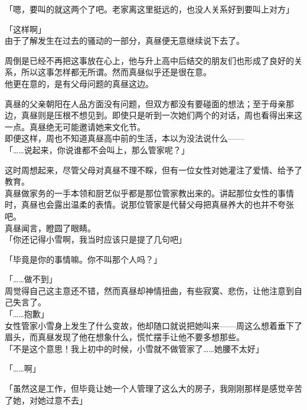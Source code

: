 「嗯，要叫的就这两个了吧。老家离这里挺远的，也没人关系好到要叫上对方」

「这样啊」\\

由于了解发生在过去的骚动的一部分，真昼便无意继续说下去了。

周倒是已经不再把这事放在心上，他与升上高中后结交的朋友们也形成了良好的关系，所以这事怎样都无所谓。然而真昼似乎还是很在意。\\

他更在意的，是有父母问题的真昼这边。

真昼的父亲朝阳在人品方面没有问题，但双方都没有要碰面的想法；至于母亲那边，真昼则是压根不想见到。即使只是听到一次她们两个的对话，周也看得出来这一点。真昼绝无可能邀请她来文化节。\\

即便这样，周也不知道真昼高中前的生活，本以为没法说什么——\\

「……说起来，你说谁都不会叫上，那么管家呢？」

这时周想起来，尽管父母对真昼不理不睬，但有一位女性对她灌注了爱情、给予了教育。\\

真昼做家务的一手本领和厨艺似乎都是那位管家教出来的。讲起那位女性的事情时，真昼也会露出温柔的表情。说那位管家是代替父母把真昼养大的也并不夸张吧。\\

真昼闻言，瞪圆了眼睛。\\

「你还记得小雪啊，我当时应该只是提了几句吧」

「毕竟是你的事情嘛。你不叫那个人吗？」

「……做不到」\\

周觉得自己这主意还不错，然而真昼却神情扭曲，有些寂寞、悲伤，让他注意到自己失言了。\\

「……抱歉」\\

女性管家小雪身上发生了什么变故，他却随口就说把她叫来——周这么想着垂下了眉头，而真昼发现了他在想象什么，慌忙摆手让他不要多想那些。\\

「不是这个意思！我上初中的时候，小雪就不做管家了……她腰不太好」

「……啊」

「虽然这是工作，但毕竟让她一个人管理了这么大的房子，我刚刚那样是感觉辛苦了她，对她过意不去」\\

